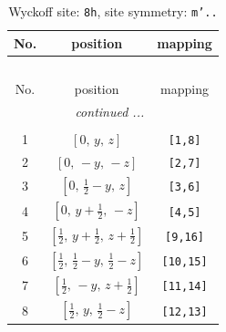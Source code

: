\documentclass[fleqn,8pt]{jsarticle}
\begin{document}
\begin{longtable}{ccc}
\caption{Wyckoff site: {\tt 8h}, site symmetry: {\tt m'..}}
 \\
 \hline \hline
No. & position & mapping \\ \hline \endfirsthead

\multicolumn{2}{l}{\tablename\ \thetable{}} \\
 \hline \hline
No. & position & mapping \\ \hline \endhead

 \hline \hline
\multicolumn{2}{r}{\footnotesize\it continued ...} \\ \endfoot

 \hline \hline
\multicolumn{2}{r}{} \\ \endlastfoot

1 & $\left[ 0,\, y,\, z \right]$ & {\tt [1,8]} \\ \hline
2 & $\left[ 0,\, - y,\, - z \right]$ & {\tt [2,7]} \\ \hline
3 & $\left[ 0,\, \frac{1}{2} - y,\, z \right]$ & {\tt [3,6]} \\ \hline
4 & $\left[ 0,\, y + \frac{1}{2},\, - z \right]$ & {\tt [4,5]} \\ \hline
5 & $\left[ \frac{1}{2},\, y + \frac{1}{2},\, z + \frac{1}{2} \right]$ & {\tt [9,16]} \\ \hline
6 & $\left[ \frac{1}{2},\, \frac{1}{2} - y,\, \frac{1}{2} - z \right]$ & {\tt [10,15]} \\ \hline
7 & $\left[ \frac{1}{2},\, - y,\, z + \frac{1}{2} \right]$ & {\tt [11,14]} \\ \hline
8 & $\left[ \frac{1}{2},\, y,\, \frac{1}{2} - z \right]$ & {\tt [12,13]} \\
\end{longtable}
\renewcommand{\arraystretch}{1.2}
\end{document}

